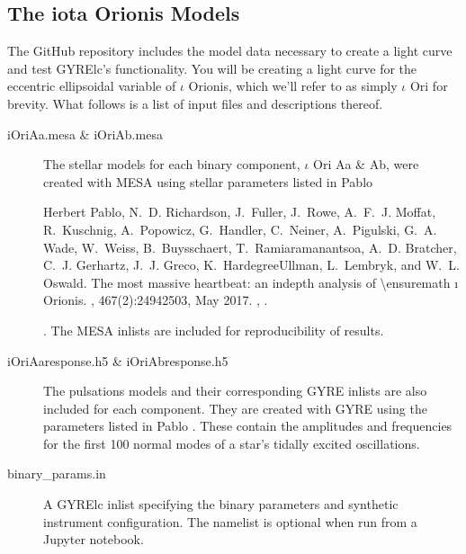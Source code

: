 \documentclass[letterpaper,10pt,english]{sphinxmanual}
\begin{document}
\subsection{The iota Orionis Models}
\label{\detokenize{user-guide/python-walkthrough:the-iota-orionis-models}}
\sphinxAtStartPar
The GitHub repository includes the model data necessary to create a light curve and test GYRE\sphinxhyphen{}lc’s functionality. You will be creating a light curve for the eccentric ellipsoidal variable of \({\iota}\) Orionis, which we’ll refer to as simply \({\iota}\) Ori for brevity. What follows is a list of input files and descriptions thereof.
\begin{description}
\item[{iOri\sphinxhyphen{}Aa.mesa \& iOri\sphinxhyphen{}Ab.mesa}] \leavevmode
\sphinxAtStartPar
The stellar models for each binary component, \({\iota}\) Ori Aa \& Ab, were created with MESA using stellar parameters listed in Pablo %
\begin{footnote}[1]\sphinxAtStartFootnote
Herbert Pablo, N. D. Richardson, J. Fuller, J. Rowe, A. F. J. Moffat, R. Kuschnig, A. Popowicz, G. Handler, C. Neiner, A. Pigulski, G. A. Wade, W. Weiss, B. Buysschaert, T. Ramiaramanantsoa, A. D. Bratcher, C. J. Gerhartz, J. J. Greco, K. Hardegree\sphinxhyphen{}Ullman, L. Lembryk, and W. L. Oswald. The most massive heartbeat: an in\sphinxhyphen{}depth analysis of \textbackslash{}ensuremath ı Orionis. , 467(2):2494\textendash{}2503, May 2017. , .
%
\end{footnote}. The MESA inlists are included for reproducibility of results.

\item[{iOri\sphinxhyphen{}Aa\sphinxhyphen{}response.h5 \& iOri\sphinxhyphen{}Ab\sphinxhyphen{}response.h5}] \leavevmode
\sphinxAtStartPar
The pulsations models and their corresponding GYRE inlists are also included for each component. They are created with GYRE using the parameters listed in Pablo \sphinxfootnotemark[1]. These contain the amplitudes and frequencies for the first 100 normal modes of a star’s tidally excited oscillations.

\item[{binary\_params.in}] \leavevmode
\sphinxAtStartPar
A GYRE\sphinxhyphen{}lc inlist specifying the binary parameters and synthetic instrument configuration. The  namelist is optional when run from a Jupyter notebook.


\end{description}
\end{document}
